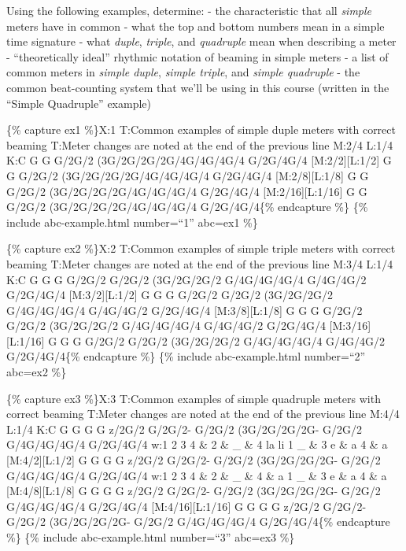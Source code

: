 \documentclass{book}
\begin{document}
Using the following examples, determine: - the characteristic that all
\emph{simple} meters have in common - what the top and bottom numbers mean in
a simple time signature - what \emph{duple}, \emph{triple}, and
\emph{quadruple} mean when describing a meter - ``theoretically ideal''
rhythmic notation of beaming in simple meters - a list of common meters in
\emph{simple duple}, \emph{simple triple}, and \emph{simple quadruple} - the
common beat-counting system that we'll be using in this course (written in the
``Simple Quadruple'' example)

\{\% capture ex1 \%\}X:1 T:Common examples of simple duple meters with correct
beaming T:Meter changes are noted at the end of the previous line M:2/4 L:1/4
K:C G G \textbar{} G/2G/2 (3G/2G/2G/2\textbar G/4G/4G/4G/4
G/2G/4G/4\textbar\textbar{} {[}M:2/2{]}{[}L:1/2{]} G G \textbar{} G/2G/2
(3G/2G/2G/2\textbar G/4G/4G/4G/4 G/2G/4G/4\textbar\textbar{}
{[}M:2/8{]}{[}L:1/8{]} G G \textbar{} G/2G/2 (3G/2G/2G/2\textbar G/4G/4G/4G/4
G/2G/4G/4\textbar\textbar{} {[}M:2/16{]}{[}L:1/16{]} G G \textbar{} G/2G/2
(3G/2G/2G/2\textbar G/4G/4G/4G/4 G/2G/4G/4\textbar\textbar\{\% endcapture \%\}
\{\% include abc-example.html number=``1'' abc=ex1 \%\}

\{\% capture ex2 \%\}X:2 T:Common examples of simple triple meters with
correct beaming T:Meter changes are noted at the end of the previous line
M:3/4 L:1/4 K:C G G G\textbar{} G/2G/2 G/2G/2 (3G/2G/2G/2\textbar{}
G/4G/4G/4G/4 G/4G/4G/2 G/2G/4G/4\textbar\textbar{} {[}M:3/2{]}{[}L:1/2{]} G G
G\textbar{} G/2G/2 G/2G/2 (3G/2G/2G/2\textbar{} G/4G/4G/4G/4 G/4G/4G/2
G/2G/4G/4\textbar\textbar{} {[}M:3/8{]}{[}L:1/8{]} G G G\textbar{} G/2G/2
G/2G/2 (3G/2G/2G/2\textbar{} G/4G/4G/4G/4 G/4G/4G/2
G/2G/4G/4\textbar\textbar{} {[}M:3/16{]}{[}L:1/16{]} G G G\textbar{} G/2G/2
G/2G/2 (3G/2G/2G/2\textbar{} G/4G/4G/4G/4 G/4G/4G/2
G/2G/4G/4\textbar\textbar\{\% endcapture \%\} \{\% include abc-example.html
number=``2'' abc=ex2 \%\}

\{\% capture ex3 \%\}X:3 T:Common examples of simple quadruple meters with
correct beaming T:Meter changes are noted at the end of the previous line
M:4/4 L:1/4 K:C G G G G\textbar{} z/2G/2 G/2G/2- G/2G/2 (3G/2G/2G/2\textbar G-
G/2G/2 G/4G/4G/4G/4 G/2G/4G/4\textbar\textbar{} w:1 2 3 4 \& 2 \& \_ \& 4 la
li 1 \_ \& 3 e \& a 4 \& a {[}M:4/2{]}{[}L:1/2{]} G G G G\textbar{} z/2G/2
G/2G/2- G/2G/2 (3G/2G/2G/2\textbar G- G/2G/2 G/4G/4G/4G/4
G/2G/4G/4\textbar\textbar{} w:1 2 3 4 \& 2 \& \_ \& 4 \& a 1 \_ \& 3 e \& a 4
\& a {[}M:4/8{]}{[}L:1/8{]} G G G G\textbar{} z/2G/2 G/2G/2- G/2G/2
(3G/2G/2G/2\textbar G- G/2G/2 G/4G/4G/4G/4 G/2G/4G/4\textbar\textbar{}
{[}M:4/16{]}{[}L:1/16{]} G G G G\textbar{} z/2G/2 G/2G/2- G/2G/2
(3G/2G/2G/2\textbar G- G/2G/2 G/4G/4G/4G/4 G/2G/4G/4\textbar\textbar\{\%
endcapture \%\} \{\% include abc-example.html number=``3'' abc=ex3 \%\}
\end{document}
